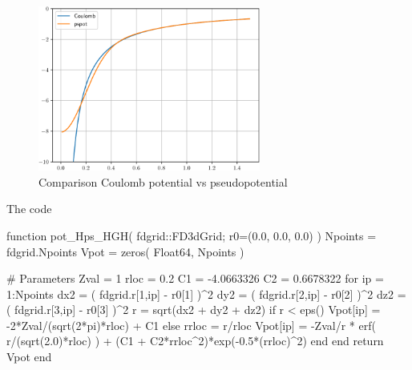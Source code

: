 \begin{figure}[H]
{\centering
\includegraphics[width=0.65\textwidth]{../codes/sch_3d/IMG_H_Coulomb_vs_pspot.pdf}
\par}
\caption{Comparison Coulomb potential vs pseudopotential}
\end{figure}

The code
\begin{juliacode}
function pot_Hps_HGH( fdgrid::FD3dGrid; r0=(0.0, 0.0, 0.0) )
    Npoints = fdgrid.Npoints
    Vpot = zeros( Float64, Npoints )

    # Parameters
    Zval = 1
    rloc = 0.2
    C1 = -4.0663326
    C2 = 0.6678322
    for ip = 1:Npoints
        dx2 = ( fdgrid.r[1,ip] - r0[1] )^2
        dy2 = ( fdgrid.r[2,ip] - r0[2] )^2
        dz2 = ( fdgrid.r[3,ip] - r0[3] )^2
        r = sqrt(dx2 + dy2 + dz2)
        if r < eps()
            Vpot[ip] = -2*Zval/(sqrt(2*pi)*rloc) + C1
        else
            rrloc = r/rloc
            Vpot[ip] = -Zval/r * erf( r/(sqrt(2.0)*rloc) ) +
                     (C1 + C2*rrloc^2)*exp(-0.5*(rrloc)^2)
        end
    end
    return Vpot
end
\end{juliacode}
